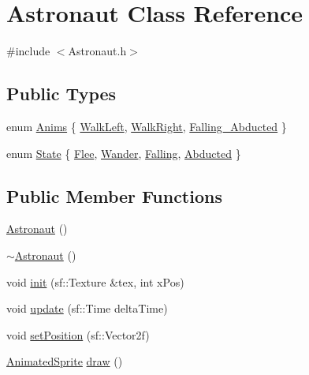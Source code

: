 \hypertarget{class_astronaut}{}\section{Astronaut Class Reference}
\label{class_astronaut}


{\ttfamily \#include $<$Astronaut.\+h$>$}

\subsection*{Public Types}
\begin{DoxyCompactItemize}
\item 
enum \hyperlink{class_astronaut_a36c4be46e5ecdf54256228b3f37d0ba3}{Anims} \{ \hyperlink{class_astronaut_a36c4be46e5ecdf54256228b3f37d0ba3af5bc7e1f65137bfd2ca4f23291f282d8}{Walk\+Left}, 
\hyperlink{class_astronaut_a36c4be46e5ecdf54256228b3f37d0ba3ac615271362fc6d2058af61d13bc5d07a}{Walk\+Right}, 
\hyperlink{class_astronaut_a36c4be46e5ecdf54256228b3f37d0ba3af300bb1b0243d51a6a6e6ac48416b043}{Falling\+\_\+\+Abducted}
 \}
\item 
enum \hyperlink{class_astronaut_ac8bdb05a39112336728de09ce0428c9f}{State} \{ \hyperlink{class_astronaut_ac8bdb05a39112336728de09ce0428c9fa5cfbf42b26cd3105e16fdebca0e00f00}{Flee}, 
\hyperlink{class_astronaut_ac8bdb05a39112336728de09ce0428c9fad608422fad91be9e6303f166e3774136}{Wander}, 
\hyperlink{class_astronaut_ac8bdb05a39112336728de09ce0428c9fa3318318cb25512762266bbc2a0cf3213}{Falling}, 
\hyperlink{class_astronaut_ac8bdb05a39112336728de09ce0428c9fa93070abd8f976010b6e4955962e63a48}{Abducted}
 \}
\end{DoxyCompactItemize}
\subsection*{Public Member Functions}
\begin{DoxyCompactItemize}
\item 
\hyperlink{class_astronaut_ac380c8593c980cf8671c9b482876c2a0}{Astronaut} ()
\item 
\hyperlink{class_astronaut_af31f9de205719a042df5f0a1879ee064}{$\sim$\+Astronaut} ()
\item 
void \hyperlink{class_astronaut_a2eb1049d06ec7546b5320648d573abbc}{init} (sf\+::\+Texture \&tex, int x\+Pos)
\item 
void \hyperlink{class_astronaut_a2df268d2fa9a1783fda0c772130cddd2}{update} (sf\+::\+Time delta\+Time)
\item 
void \hyperlink{class_astronaut_a2dff61a54b10d5fb38f68d2f63668387}{set\+Position} (sf\+::\+Vector2f)
\item 
\hyperlink{class_animated_sprite}{Animated\+Sprite} \hyperlink{class_astronaut_a0dca06c39c27c2f451de64bbc1785d0a}{draw} ()
\end{DoxyCompactItemize}


